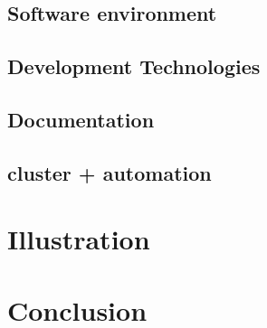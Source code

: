 

    \subsection{Software environment}
        \subsection{Development Technologies}
        \subsection{Documentation}

    \subsection{cluster + automation}

\section{Illustration}

\section{Conclusion}

